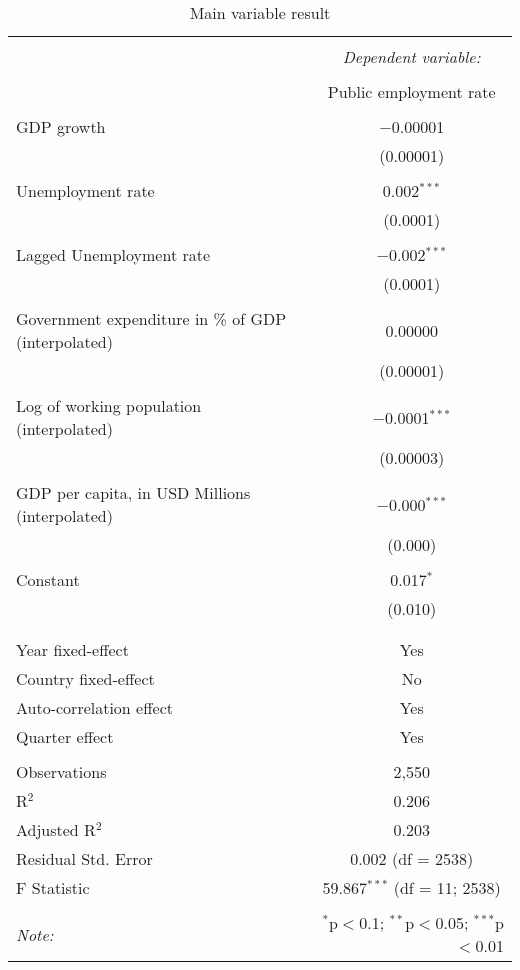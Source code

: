 
\begin{table}[!htbp] \centering 
  \caption{Main variable result} 
  \label{} 
\begin{tabular}{@{\extracolsep{5pt}}lc} 
\\[-1.8ex]\hline 
\hline \\[-1.8ex] 
 & \multicolumn{1}{c}{\textit{Dependent variable:}} \\ 
\cline{2-2} 
\\[-1.8ex] & Public employment rate \\ 
\hline \\[-1.8ex] 
 GDP growth & $-$0.00001 \\ 
  & (0.00001) \\ 
  & \\ 
 Unemployment rate & 0.002$^{***}$ \\ 
  & (0.0001) \\ 
  & \\ 
 Lagged Unemployment rate & $-$0.002$^{***}$ \\ 
  & (0.0001) \\ 
  & \\ 
 Government expenditure in \% of GDP (interpolated) & 0.00000 \\ 
  & (0.00001) \\ 
  & \\ 
 Log of working population (interpolated) & $-$0.0001$^{***}$ \\ 
  & (0.00003) \\ 
  & \\ 
 GDP per capita, in USD Millions (interpolated) & $-$0.000$^{***}$ \\ 
  & (0.000) \\ 
  & \\ 
 Constant & 0.017$^{*}$ \\ 
  & (0.010) \\ 
  & \\ 
\hline \\[-1.8ex] 
Year fixed-effect & Yes \\ 
Country fixed-effect & No \\ 
Auto-correlation effect & Yes \\ 
Quarter effect & Yes \\ 
\hline \\[-1.8ex] 
Observations & 2,550 \\ 
R$^{2}$ & 0.206 \\ 
Adjusted R$^{2}$ & 0.203 \\ 
Residual Std. Error & 0.002 (df = 2538) \\ 
F Statistic & 59.867$^{***}$ (df = 11; 2538) \\ 
\hline 
\hline \\[-1.8ex] 
\textit{Note:}  & \multicolumn{1}{r}{$^{*}$p$<$0.1; $^{**}$p$<$0.05; $^{***}$p$<$0.01} \\ 
\end{tabular} 
\end{table} 
